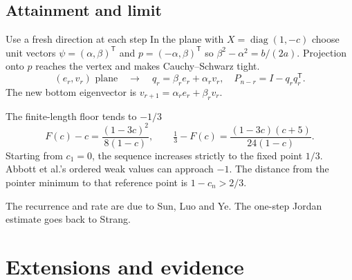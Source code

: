 \documentclass{beamer}
\begin{document}
\subsection{Attainment and limit}
\begin{frame}{Use a fresh direction at each step}
In the plane with $X=\operatorname{diag}(1,-c)$ choose unit vectors $\psi=(\alpha,\beta)^{\mathsf T}$ and $p=(-\alpha,\beta)^{\mathsf T}$ so $\beta^2-\alpha^2=b/(2a)$. Projection onto $p$ reaches the vertex and makes Cauchy--Schwarz tight.
\[
 (e_r,v_r)\text{ plane}\quad\longrightarrow\quad
 q_r=\beta_r e_r+\alpha_r v_r,\quad P_{n-r}=I-q_rq_r^{\mathsf T}.
\]
The new bottom eigenvector is $v_{r+1}=\alpha_r e_r+\beta_r v_r$.
\end{frame}

\begin{frame}{The finite-length floor tends to $-1/3$}
\[
 F(c)-c=\frac{(1-3c)^2}{8(1-c)},\qquad
 \tfrac13-F(c)=\frac{(1-3c)(c+5)}{24(1-c)}.
\]
Starting from $c_1=0$, the sequence increases strictly to the fixed point $1/3$. Abbott et al.'s ordered weak values can approach $-1$. The distance from the pointer minimum to that reference point is $1-c_n>2/3$.
\medskip

The recurrence and rate are due to Sun, Luo and Ye. The one-step Jordan estimate goes back to Strang.
\end{frame}

\section{Extensions and evidence}
\end{document}

